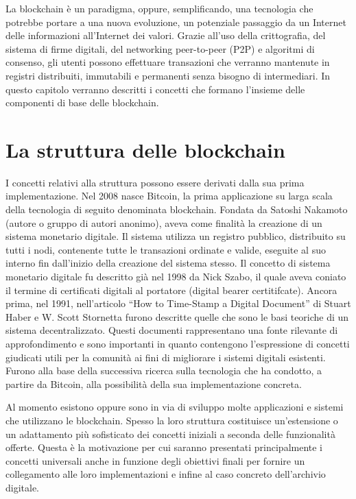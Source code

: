 La blockchain è un paradigma, oppure, semplificando, una tecnologia che potrebbe portare a una nuova evoluzione, un potenziale passaggio da un Internet delle informazioni all’Internet dei valori. Grazie all’uso della crittografia, del sistema di firme digitali, del networking peer-to-peer (P2P) e algoritmi di consenso, gli utenti possono effettuare transazioni che verranno mantenute in registri distribuiti, immutabili e permanenti senza bisogno di intermediari. In questo capitolo verranno descritti i concetti che formano l’insieme delle componenti di base delle blockchain.

\section{La struttura delle blockchain}

I concetti relativi alla struttura possono essere derivati dalla sua prima implementazione. Nel 2008 nasce Bitcoin, la prima applicazione su larga scala della tecnologia di seguito denominata blockchain. Fondata da Satoshi Nakamoto (autore o gruppo di autori anonimo), aveva come finalità la creazione di un sistema monetario digitale. Il sistema utilizza un registro pubblico, distribuito su tutti i nodi, contenente tutte le transazioni ordinate e valide, eseguite al suo interno fin dall’inizio della creazione del sistema stesso. Il concetto di sistema monetario digitale fu descritto già nel 1998 da Nick Szabo, il quale aveva coniato il termine di certificati digitali al portatore (digital bearer certitifcate). Ancora prima, nel 1991, nell’articolo “How to Time-Stamp a Digital Document” di Stuart Haber e W. Scott Stornetta furono descritte quelle che sono le basi teoriche di un sistema decentralizzato. Questi documenti rappresentano una fonte rilevante di approfondimento e sono importanti in quanto contengono l’espressione di concetti giudicati utili per la comunità ai fini di migliorare i sistemi digitali esistenti. Furono alla base della successiva ricerca sulla tecnologia che ha condotto, a partire da Bitcoin, alla possibilità della sua implementazione concreta.

Al momento esistono oppure sono in via di sviluppo molte applicazioni e sistemi che utilizzano le blockchain. Spesso la loro struttura costituisce un’estensione o un adattamento più sofisticato dei concetti iniziali a seconda delle funzionalità offerte. Questa è la motivazione per cui saranno presentati principalmente i concetti universali anche in funzione degli obiettivi finali per fornire un collegamento alle loro implementazioni e infine al caso concreto dell’archivio digitale.

